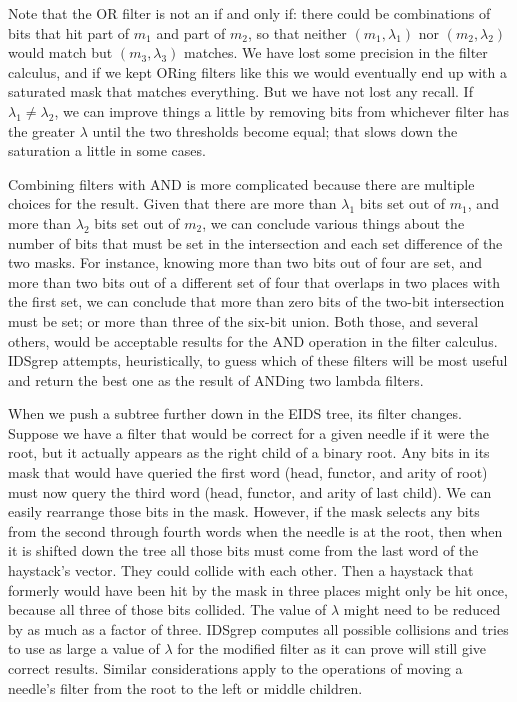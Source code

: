 \documentclass[twocolumn]{report}
\begin{document}
Note that the OR filter is not an if and only if: there could
be combinations of bits that hit part of $m_1$ and part of $m_2$, so that
neither $(m_1,\lambda_1)$ nor $(m_2,\lambda_2)$ would match but
$(m_3,\lambda_3)$ matches.  We have lost some precision in the filter
calculus, and if we kept ORing filters like this we would eventually end up
with a saturated mask that matches everything.  But we have not lost any
recall.  If $\lambda_1\ne\lambda_2$, we can improve things a
little by removing bits from whichever filter has the greater $\lambda$
until the two thresholds become equal; that slows down the saturation a
little in some cases.

Combining filters with AND is more complicated because there are multiple
choices for the result.  Given that there are more than $\lambda_1$ bits set
out of $m_1$, and more than $\lambda_2$ bits set out of $m_2$, we can
conclude various things about the number of bits that must be set in the
intersection and each set difference of the two masks.  For instance,
knowing more than two bits out of four are set, and more than two bits out
of a different set of four that overlaps in two places with the first set,
we can conclude that more than zero bits of the two-bit intersection must be
set; or more than three of the six-bit union.  Both those, and several
others, would be acceptable results for the AND operation in the filter
calculus.  IDSgrep attempts, heuristically, to guess which of these filters
will be most useful and return the best one as the result of ANDing two
lambda filters.

When we push a subtree further down in the EIDS tree, its filter changes. 
Suppose we have a filter that would be correct for a given needle if it were
the root, but it actually appears as the right child of a binary root.  Any
bits in its mask that would have queried the first word (head, functor, and
arity of root) must now query the third word (head, functor, and arity of
last child).  We can easily rearrange those bits in the mask.  However, if
the mask selects any bits from the second through fourth words when the
needle is at the root, then when it is shifted down the tree all those bits
must come from the last word of the haystack's vector.  They could collide
with each other.  Then a haystack that formerly would have been hit by the
mask in three places might only be hit once, because all three of those bits
collided.  The value of $\lambda$ might need to be reduced by as much as a
factor of three.  IDSgrep computes all possible collisions and tries to use
as large a value of $\lambda$ for the modified filter as it can prove will
still give correct results.  Similar considerations apply to the operations
of moving a needle's filter from the root to the left or middle children.
\end{document}
